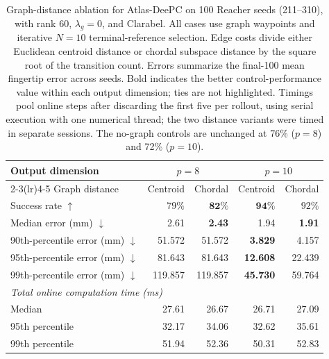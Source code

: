 \documentclass[10pt]{article}
\begin{document}
\begin{table}[htbp]
\centering
\small
\begin{tabular}{lrrrr}
\toprule
Output dimension & \multicolumn{2}{c}{$p=8$} & \multicolumn{2}{c}{$p=10$} \\
\cmidrule(lr){2-3}\cmidrule(lr){4-5}
Graph distance & Centroid & Chordal & Centroid & Chordal \\
\midrule
Success rate $\uparrow$ & $79\%$ & $\mathbf{82\%}$ & $\mathbf{94\%}$ & $92\%$ \\
Median error (mm) $\downarrow$ & 2.61 & \textbf{2.43} & 1.94 & \textbf{1.91} \\
90th-percentile error (mm) $\downarrow$ & 51.572 & 51.572 & \textbf{3.829} & 4.157 \\
95th-percentile error (mm) $\downarrow$ & 81.643 & 81.643 & \textbf{12.608} & 22.439 \\
99th-percentile error (mm) $\downarrow$ & 119.857 & 119.857 & \textbf{45.730} & 59.764 \\
\midrule
\multicolumn{5}{l}{\textit{Total online computation time (ms)}} \\
Median & 27.61 & 26.67 & 26.71 & 27.09 \\
95th percentile & 32.17 & 34.06 & 32.62 & 35.61 \\
99th percentile & 51.94 & 52.36 & 50.31 & 52.83 \\
\bottomrule
\end{tabular}
\caption{Graph-distance ablation for Atlas-DeePC on 100 Reacher seeds (211--310), with rank 60, $\lambda_g=0$, and Clarabel. All cases use graph waypoints and iterative $N=10$ terminal-reference selection. Edge costs divide either Euclidean centroid distance or chordal subspace distance by the square root of the transition count. Errors summarize the final-100 mean fingertip error across seeds. Bold indicates the better control-performance value within each output dimension; ties are not highlighted. Timings pool online steps after discarding the first five per rollout, using serial execution with one numerical thread; the two distance variants were timed in separate sessions. The no-graph controls are unchanged at 76\% ($p=8$) and 72\% ($p=10$).}
\label{tab:reacher-centroid-chordal}
\end{table}
\end{document}

